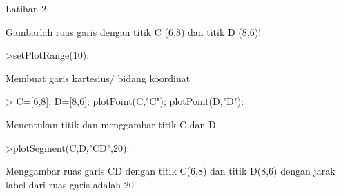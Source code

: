 \documentclass[a4paper,10pt]{article}
\begin{document}
\begin{eulernotebook}
\begin{eulercomment}
\begin{eulercomment}
\begin{eulercomment}
Latihan 2\\
\end{eulercomment}
\eulersubheading{}
\begin{eulercomment}
Gambarlah ruas garis dengan titik C (6,8) dan titik D (8,6)!
\end{eulercomment}
\begin{eulerprompt}
>setPlotRange(10);
\end{eulerprompt}
\begin{eulercomment}
Membuat garis kartesius/ bidang koordinat
\end{eulercomment}
\begin{eulerprompt}
> C=[6,8]; D=[8,6]; plotPoint(C,"C"); plotPoint(D,"D"):
\end{eulerprompt}
\begin{eulercomment}
Menentukan titik dan menggambar titik C dan D
\end{eulercomment}
\begin{eulerprompt}
>plotSegment(C,D,"CD",20):
\end{eulerprompt}
\begin{eulercomment}
Menggambar ruas garis CD dengan titik C(6,8) dan titik D(8,6) dengan
jarak label dari ruas garis adalah 20


\end{eulercomment}
\end{eulercomment}
\end{eulercomment}
\end{eulernotebook}
\end{document}
